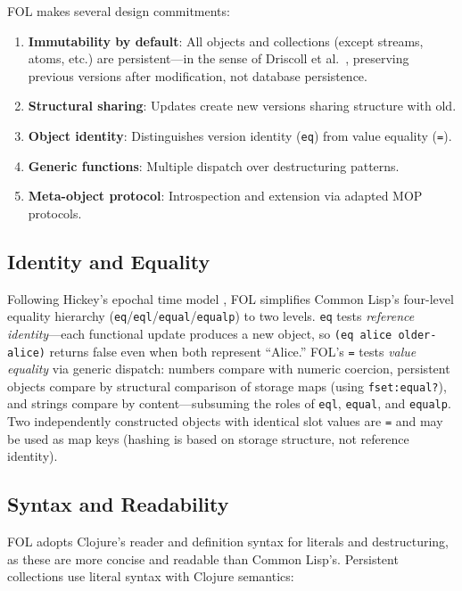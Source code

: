 \documentclass[sigconf,nonacm,review]{acmart}
\begin{document}
FOL makes several design commitments:

\begin{enumerate}
\item \textbf{Immutability by default}: All objects and collections (except streams, atoms, etc.) are persistent---in the sense of Driscoll et al.~\cite{Driscoll1989}, preserving previous versions after modification, not database persistence.
\item \textbf{Structural sharing}: Updates create new versions sharing structure with old.
\item \textbf{Object identity}: Distinguishes version identity (\texttt{eq}) from value equality (\texttt{=}).
\item \textbf{Generic functions}: Multiple dispatch over destructuring patterns.
\item \textbf{Meta-object protocol}: Introspection and extension via adapted MOP protocols.
\end{enumerate}

\subsection{Identity and Equality}

Following Hickey's epochal time model \cite{Hickey2009}, FOL simplifies Common Lisp's four-level equality hierarchy (\texttt{eq}/\texttt{eql}/\texttt{equal}/\texttt{equalp}) to two levels. \texttt{eq} tests \textit{reference identity}---each functional update produces a new object, so \texttt{(eq alice older-alice)} returns false even when both represent ``Alice.'' FOL's \texttt{=} tests \textit{value equality} via generic dispatch: numbers compare with numeric coercion, persistent objects compare by structural comparison of storage maps (using \texttt{fset:equal?}), and strings compare by content---subsuming the roles of \texttt{eql}, \texttt{equal}, and \texttt{equalp}. Two independently constructed objects with identical slot values are \texttt{=} and may be used as map keys (hashing is based on storage structure, not reference identity).

\subsection{Syntax and Readability}

FOL adopts Clojure's reader and definition syntax for literals and destructuring, as these are more concise and readable than Common Lisp's. Persistent collections use literal syntax with Clojure semantics:
\end{document}
